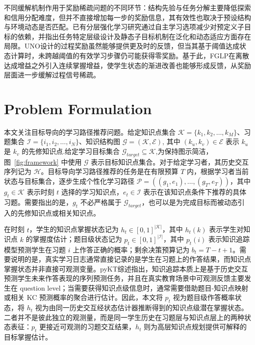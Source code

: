 \documentclass[11pt,a4paper]{article}
\begin{document}
不同缓解机制作用于奖励稀疏问题的不同环节：结构先验与任务分解主要降低探索和信用分配难度，但并不直接增加每一步的奖励信息，其有效性也取决于预设结构与环境动态是否匹配。已有分层强化学习研究通过自主学习选项减少对预定义子目标的依赖，并指出任务特定层级设计及静态子目标机制在泛化和动态适应方面存在局限\cite{bacon2017optioncritic,nachum2018dataefficient,gurtler2021timed}。UNO设计的过程奖励虽然能够提供更及时的反馈，但当其基于阈值达成状态计算时，未跨越阈值的有效学习步骤仍可能获得零奖励。基于此，FGLP在离散达成增益之外引入连续掌握增益，使学生状态的渐进改善也能够形成反馈，从奖励层面进一步缓解过程信号稀疏。

\section{Problem Formulation}

本文关注目标导向的学习路径推荐问题。给定知识点集合 $\mathcal{K}=\{k_1,k_2,\dots,k_M\}$、习题集合 $\mathcal{I}=\{i_1,i_2,\dots,i_N\}$、知识结构图 $\mathcal{G}=(\mathcal{K},\mathcal{E})$, 其中 $(k_u,k_v)\in\mathcal{E}$ 表示 $k_u$ 是 $k_v$ 的先修知识点.给定学习目标集合 $\mathcal{G}_{target}\subseteq\mathcal{K}$,为保持图示简洁，图~\ref{fig:framework} 中使用 $\mathcal{G}$ 表示目标知识点集合。对于给定学习者，其历史交互序列记为 $\mathcal{H}$。目标导向学习路径推荐的任务是在有限预算 $T$ 内，根据学习者当前状态与目标集合，逐步生成个性化学习路径 $\mathcal{P}=((g_1,e_1),\dots,(g_T,e_T))$，其中 $g_t\in\mathcal{K}$ 表示时刻 $t$ 选择的学习知识点，$e_t\in\mathcal{I}$ 表示在该知识点条件下推荐的具体习题。需要指出的是，$g_t$ 不必严格属于 $\mathcal{G}_{target}$，也可以是为完成目标而被动态引入的先修知识点或相关知识点。

在时刻 $t$，学生的知识点掌握状态记为 $h_t\in[0,1]^{|\mathcal{K}|}$，其中 $h_t(k)$ 表示学生对知识点 $k$ 的掌握度估计；题目级状态记为 $p_t\in[0,1]^{|\mathcal{I}|}$，其中 $p_t(i)$ 表示知识追踪模型预测学生在习题 $i$ 上作答正确的概率；剩余决策预算记为 $b_t=T-t+1$。需要说明的是，真实学习日志通常直接记录的是学生在习题上的作答结果，而知识点掌握状态并非直接可观测变量。pyKT综述\cite{liu2025deep}指出，知识追踪本质上是基于历史交互预测学生未来作答表现的序列预测任务，并且在真实教育场景中可观测反馈主要发生在 question level；当需要获得知识点级信息时，通常需要借助题目-知识点映射或相关 KC 预测概率的聚合进行估计。因此，本文将 $p_t$ 视为题目级作答概率状态，将 $h_t$ 视为由同一历史交互经状态估计器推断得到的知识点级潜在掌握状态。二者并不是彼此独立的观测量，而是同一学生历史在习题层与知识点层上的两种状态表征：$p_t$ 更接近可观测的习题交互结果，$h_t$ 则为高层知识点规划提供可解释的目标掌握估计。
\end{document}
